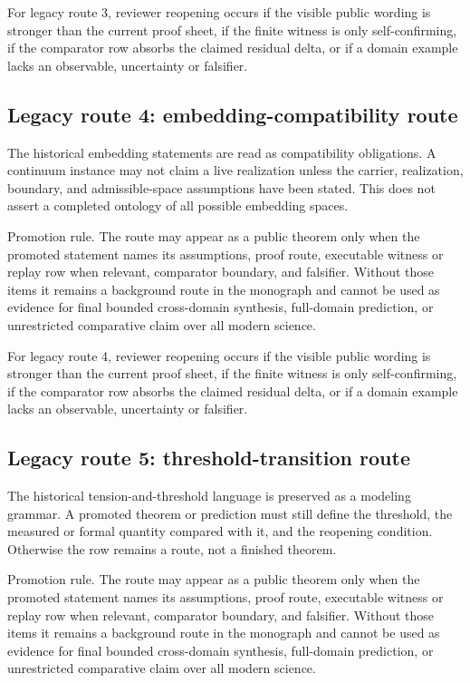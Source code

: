 For legacy route 3, reviewer reopening occurs if the visible public wording is stronger than the current proof sheet, if the finite witness is only self-confirming, if the comparator row absorbs the claimed residual delta, or if a domain example lacks an observable, uncertainty or falsifier.


\subsection{Legacy route 4: embedding-compatibility route}

The historical embedding statements are read as compatibility obligations. A continuum instance may not claim a live realization unless the carrier, realization, boundary, and admissible-space assumptions have been stated. This does not assert a completed ontology of all possible embedding spaces.


Promotion rule. The route may appear as a public theorem only when the promoted statement names its assumptions, proof route, executable witness or replay row when relevant, comparator boundary, and falsifier. Without those items it remains a background route in the monograph and cannot be used as evidence for final bounded cross-domain synthesis, full-domain prediction, or unrestricted comparative claim over all modern science.


For legacy route 4, reviewer reopening occurs if the visible public wording is stronger than the current proof sheet, if the finite witness is only self-confirming, if the comparator row absorbs the claimed residual delta, or if a domain example lacks an observable, uncertainty or falsifier.


\subsection{Legacy route 5: threshold-transition route}

The historical tension-and-threshold language is preserved as a modeling grammar. A promoted theorem or prediction must still define the threshold, the measured or formal quantity compared with it, and the reopening condition. Otherwise the row remains a route, not a finished theorem.


Promotion rule. The route may appear as a public theorem only when the promoted statement names its assumptions, proof route, executable witness or replay row when relevant, comparator boundary, and falsifier. Without those items it remains a background route in the monograph and cannot be used as evidence for final bounded cross-domain synthesis, full-domain prediction, or unrestricted comparative claim over all modern science.


